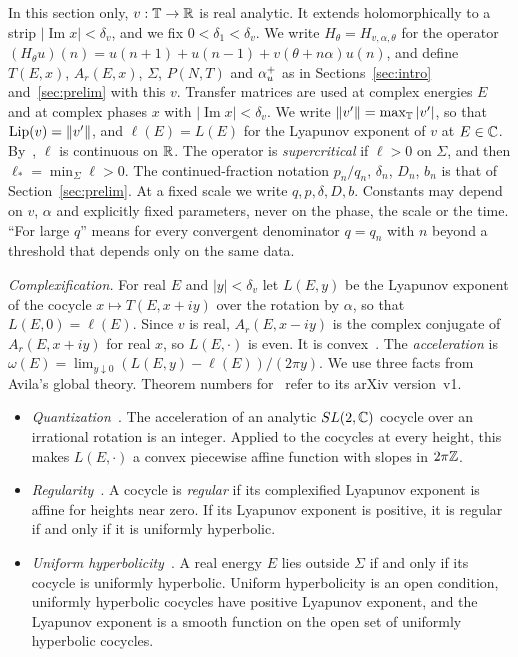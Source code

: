 In this section only, $v:\mathbb T\to\mathbb R$ is real analytic. It extends holomorphically to a strip $|\operatorname{Im}x|<\delta_v$, and we fix $0<\delta_1<\delta_v$. We write $H_\theta=H_{v,\alpha,\theta}$ for the operator $(H_\theta u)(n)=u(n+1)+u(n-1)+v(\theta+n\alpha)u(n)$, and define $T(E,x)$, $A_r(E,x)$, $\Sigma$, $P(N,T)$ and $\alpha_u^+$ as in Sections~\ref{sec:intro} and~\ref{sec:prelim} with this $v$. Transfer matrices are used at complex energies $E$ and at complex phases $x$ with $|\operatorname{Im}x|<\delta_v$. We write $\|v'\|=\max_\mathbb T|v'|$, so that $\operatorname{Lip}(v)=\|v'\|$, and $\ell(E)=L(E)$ for the Lyapunov exponent of $v$ at $E\in\mathbb C$. By~\cite[Theorem~1]{BourgainJitomirskaya2002}, $\ell$ is continuous on $\mathbb R$. The operator is \emph{supercritical} if $\ell>0$ on $\Sigma$, and then $\ell_*=\min_\Sigma\ell>0$. The continued-fraction notation $p_n/q_n$, $\delta_n$, $D_n$, $b_n$ is that of Section~\ref{sec:prelim}. At a fixed scale we write $q,p,\delta,D,b$. Constants may depend on $v$, $\alpha$ and explicitly fixed parameters, never on the phase, the scale or the time. ``For large $q$'' means for every convergent denominator $q=q_n$ with $n$ beyond a threshold that depends only on the same data.

\emph{Complexification.} For real $E$ and $|y|<\delta_v$ let $L(E,y)$ be the Lyapunov exponent of the cocycle $x\mapsto T(E,x+iy)$ over the rotation by $\alpha$, so that $L(E,0)=\ell(E)$. Since $v$ is real, $A_r(E,x-iy)$ is the complex conjugate of $A_r(E,x+iy)$ for real $x$, so $L(E,\cdot)$ is even. It is convex~\cite[Section~1.3]{Avila2015}. The \emph{acceleration} is $\omega(E)=\lim_{y\downarrow0}(L(E,y)-\ell(E))/(2\pi y)$. We use three facts from Avila's global theory. Theorem numbers for~\cite{Avila2015} refer to its arXiv version~v1.
\begin{itemize}
\item[(A1)] \emph{Quantization}~\cite[Theorem~5]{Avila2015}. The acceleration of an analytic $SL(2,\mathbb C)$ cocycle over an irrational rotation is an integer. Applied to the cocycles at every height, this makes $L(E,\cdot)$ a convex piecewise affine function with slopes in $2\pi\mathbb Z$.
\item[(A2)] \emph{Regularity}~\cite[Theorem~6]{Avila2015}. A cocycle is \emph{regular} if its complexified Lyapunov exponent is affine for heights near zero. If its Lyapunov exponent is positive, it is regular if and only if it is uniformly hyperbolic.
\item[(A3)] \emph{Uniform hyperbolicity}~\cite[Section~1.3]{Avila2015}. A real energy $E$ lies outside $\Sigma$ if and only if its cocycle is uniformly hyperbolic. Uniform hyperbolicity is an open condition, uniformly hyperbolic cocycles have positive Lyapunov exponent, and the Lyapunov exponent is a smooth function on the open set of uniformly hyperbolic cocycles.
\end{itemize}

